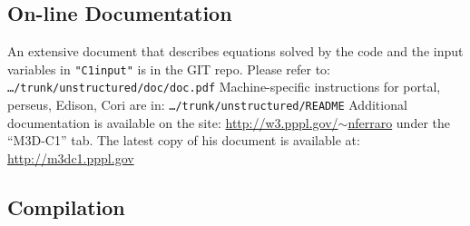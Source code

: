 \subsection{On-line Documentation}
An extensive document that describes equations solved by the code and the input variables in \texttt{"C1input"} is in the GIT repo. Please refer to: \texttt{\ldots/trunk/unstructured/doc/doc.pdf}
\newline\newline
Machine-specific instructions for portal, perseus, Edison, Cori are in:  
\texttt{\ldots/trunk/unstructured/README}
\newline\newline
Additional documentation is available on the site: \href{http://w3.pppl.gov/~nferraro}{http://w3.pppl.gov/$\sim$nferraro} under the ``M3D-C1'' tab.
\newline\newline
The latest copy of his document is available at: \href{http://m3dc1.pppl.gov}{http://m3dc1.pppl.gov}

\subsection{Compilation}

